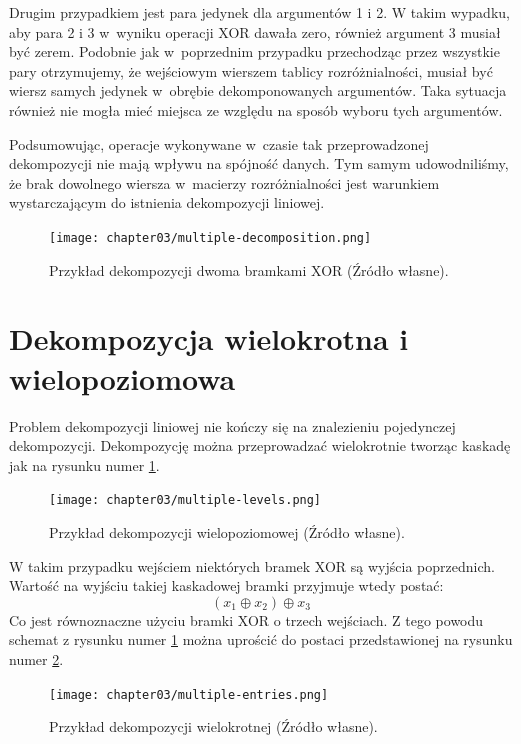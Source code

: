 Drugim przypadkiem jest para jedynek dla argumentów 1 i 2.
W takim wypadku,
aby para 2 i 3 w~wyniku operacji XOR dawała zero,
również argument 3 musiał być zerem.
Podobnie jak w~poprzednim przypadku przechodząc przez wszystkie pary otrzymujemy,
że wejściowym wierszem tablicy rozróżnialności,
musiał być wiersz samych jedynek w~obrębie dekomponowanych argumentów.
Taka sytuacja również nie mogła mieć miejsca ze względu na sposób wyboru tych argumentów.

Podsumowując,
operacje wykonywane w~czasie tak przeprowadzonej dekompozycji nie mają wpływu na spójność danych.
Tym samym udowodniliśmy,
że brak dowolnego wiersza w~macierzy rozróżnialności jest warunkiem wystarczającym do istnienia dekompozycji liniowej.

\begin{figure}[H]
\centering
\texttt{[image: chapter03/multiple-decomposition.png]}
\caption{Przykład dekompozycji dwoma bramkami XOR (Źródło własne).}
\end{figure}

\section{Dekompozycja wielokrotna i wielopoziomowa}

Problem dekompozycji liniowej nie kończy się na znalezieniu pojedynczej dekompozycji.
Dekompozycję można przeprowadzać wielokrotnie tworząc kaskadę jak na rysunku numer \ref{fig:multiple-levels}.

\begin{figure}[H]
\centering
\texttt{[image: chapter03/multiple-levels.png]}
\caption{Przykład dekompozycji wielopoziomowej (Źródło własne).}
\label{fig:multiple-levels}
\end{figure}

W takim przypadku wejściem niektórych bramek XOR są wyjścia poprzednich.
Wartość na wyjściu takiej kaskadowej bramki przyjmuje wtedy postać:
\begin{equation}
(x_1 \oplus x_2) \oplus x_3
\end{equation}
Co jest równoznaczne użyciu bramki XOR o trzech wejściach.
Z tego powodu schemat z rysunku numer \ref{fig:multiple-levels} można uprościć do postaci przedstawionej na rysunku numer \ref{fig:multiple-entries}.

\begin{figure}[H]
\centering
\texttt{[image: chapter03/multiple-entries.png]}
\caption{Przykład dekompozycji wielokrotnej (Źródło własne).}
\label{fig:multiple-entries}
\end{figure}

